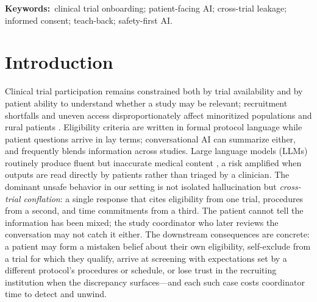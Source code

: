 \documentclass[11pt]{article}
\begin{document}
\begin{abstract}
\end{abstract}

\noindent\textbf{Keywords:}\, clinical trial onboarding; patient-facing AI; cross-trial leakage; informed consent; teach-back; safety-first AI.

\section{Introduction}

Clinical trial participation remains constrained both by trial availability and by patient ability to understand whether a study may be relevant; recruitment shortfalls and uneven access disproportionately affect minoritized populations and rural patients \citep{unger2019recruitment,clark2019barriers,fda2022diversity}. Eligibility criteria are written in formal protocol language while patient questions arrive in lay terms; conversational AI can summarize either, and frequently blends information across studies. Large language models (LLMs) routinely produce fluent but inaccurate medical content \citep{ji2023hallucination,maynez2020faithfulness,pal2023medhalu,huang2025survey,ayers2023comparing}, a risk amplified when outputs are read directly by patients rather than triaged by a clinician. The dominant unsafe behavior in our setting is not isolated hallucination but \emph{cross-trial conflation}: a single response that cites eligibility from one trial, procedures from a second, and time commitments from a third. The patient cannot tell the information has been mixed; the study coordinator who later reviews the conversation may not catch it either. The downstream consequences are concrete: a patient may form a mistaken belief about their own eligibility, self-exclude from a trial for which they qualify, arrive at screening with expectations set by a different protocol's procedures or schedule, or lose trust in the recruiting institution when the discrepancy surfaces---and each such case costs coordinator time to detect and unwind.
\end{document}
